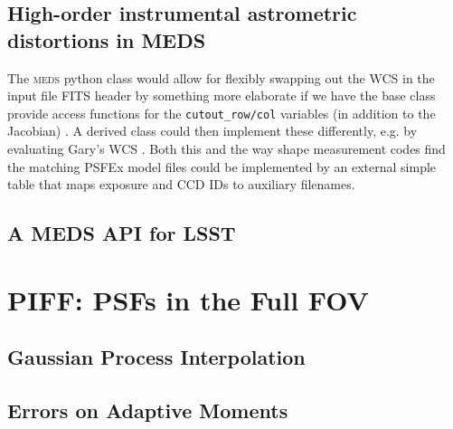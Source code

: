 \documentclass[\docopts]{\docclass}
\begin{document}
\subsection{High-order instrumental astrometric distortions in MEDS}


The \textsc{meds} python class would allow for flexibly swapping out the WCS in the input file FITS header by something more elaborate if we have the base class provide access functions for the \texttt{cutout\_row/col} variables (in addition to the Jacobian) . A derived class could then implement these differently, e.g. by evaluating Gary's WCS . Both this and the way shape measurement codes find the matching PSFEx model files could be implemented by an external simple table that maps exposure and CCD IDs to auxiliary filenames.


\subsection{A MEDS API for LSST}



\section{PIFF: PSFs in the Full FOV}


\subsection{Gaussian Process Interpolation}


\subsection{Errors on Adaptive Moments}
\end{document}
